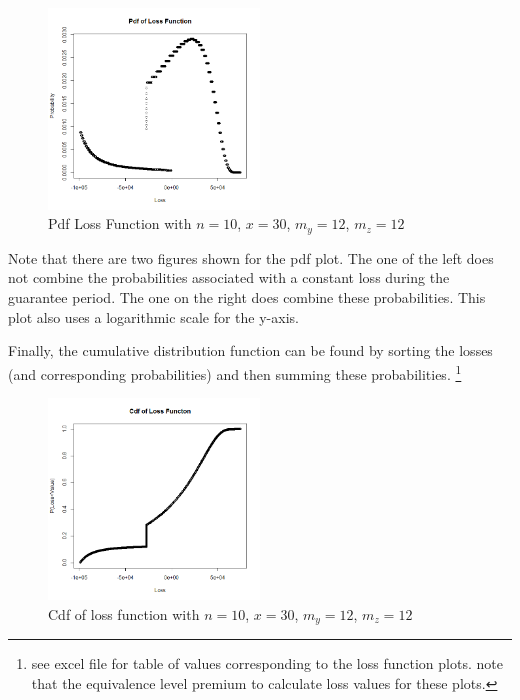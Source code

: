 \documentclass[12pt]{article}
\begin{document}
\begin{figure}[!ht]
\begin{center}
\includegraphics[width=0.5\textwidth]{images/pdfLossFunction}
\end{center}
\vspace{-5mm}
\caption{Pdf Loss Function with $n=10$, $x=30$, $m_y=12$, $m_z=12$}
\end{figure}


Note that there are two figures shown for the pdf plot. The one of the left does not combine the probabilities associated with a constant loss during the guarantee period. The one on the right does combine these probabilities. This plot also uses a logarithmic scale for the y-axis.

Finally, the cumulative distribution function can be found by sorting the losses (and corresponding probabilities) and then summing these probabilities. \footnote{see excel file for table of values corresponding to the loss function plots. note that the equivalence level premium to calculate loss values for these plots.}

\begin{figure}[!ht]
\begin{center}
\includegraphics[width=0.5\textwidth]{images/cdfLossFunction}
\end{center}
\caption{Cdf of loss function with $n=10$, $x=30$, $m_y=12$, $m_z=12$}
\label{figure:cefLossFunction}
\end{figure}
\end{document}
